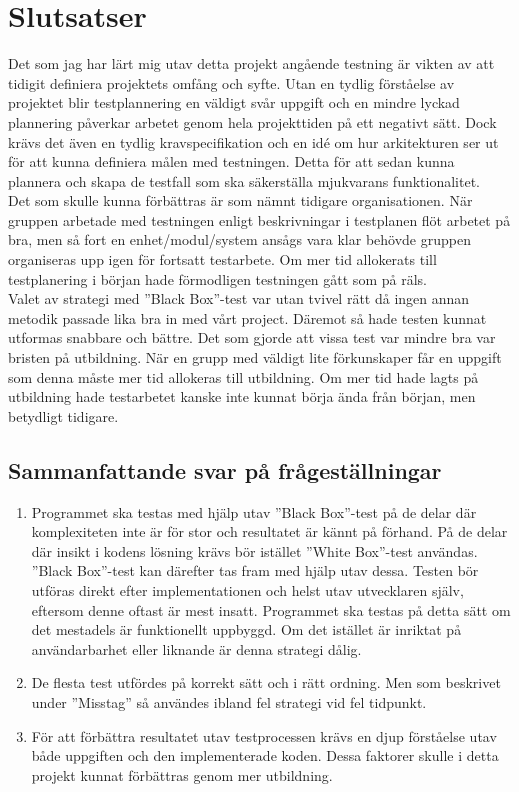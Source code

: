 \section{Slutsatser}
	Det som jag har lärt mig utav detta projekt angående testning är vikten av att tidigit definiera projektets omfång och syfte. Utan en tydlig förståelse av projektet blir testplannering en väldigt svår uppgift och en mindre lyckad plannering påverkar arbetet genom hela projekttiden på ett negativt sätt. Dock krävs det även en tydlig kravspecifikation och en idé om hur arkitekturen ser ut för att kunna definiera målen med testningen. Detta för att sedan kunna plannera och skapa de testfall som ska säkerställa mjukvarans funktionalitet. \\
Det som skulle kunna förbättras är som nämnt tidigare organisationen. När gruppen arbetade med testningen enligt beskrivningar i testplanen flöt arbetet på bra, men så fort en enhet/modul/system ansågs vara klar behövde gruppen organiseras upp igen för fortsatt testarbete. Om mer tid allokerats till testplanering i början hade förmodligen testningen gått som på räls. \\
Valet av strategi med ''Black Box''-test var utan tvivel rätt då ingen annan metodik passade lika bra in med vårt project. Däremot så hade testen kunnat utformas snabbare och bättre. Det som gjorde att vissa test var mindre bra var bristen på utbildning. När en grupp med väldigt lite förkunskaper får en uppgift som denna måste mer tid allokeras till utbildning. Om mer tid hade lagts på utbildning hade testarbetet kanske inte kunnat börja ända från början, men betydligt tidigare.
	
\subsection{Sammanfattande svar på frågeställningar}
	\begin{enumerate}
	\item Programmet ska testas med hjälp utav ''Black Box''-test på de delar där komplexiteten inte är för stor och resultatet är kännt på förhand. På de delar där insikt i kodens lösning krävs bör istället ''White Box''-test användas. ''Black Box''-test kan därefter tas fram med hjälp utav dessa. Testen bör utföras direkt efter implementationen och helst utav utvecklaren själv, eftersom denne oftast är mest insatt. Programmet ska testas på detta sätt om det mestadels är funktionellt uppbyggd. Om det istället är inriktat på användarbarhet eller liknande är denna strategi dålig.
	\item De flesta test utfördes på korrekt sätt och i rätt ordning. Men som beskrivet under ''Misstag'' så användes ibland fel strategi vid fel tidpunkt.
	\item För att förbättra resultatet utav testprocessen krävs en djup förståelse utav både uppgiften och den implementerade koden. Dessa faktorer skulle i detta projekt kunnat förbättras genom mer utbildning.
	\end{enumerate}
	
